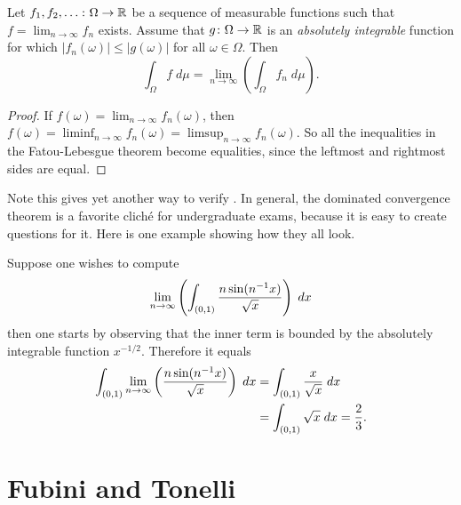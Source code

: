 \begin{corollary}
	Let $f_1, f_2, \dots \colon \Omega \to \mathbb R$
	be a sequence of measurable functions
	such that $f = \lim_{n \to \infty} f_n$ exists.
	Assume that $g \colon \Omega \to \mathbb R$ is an
	\emph{absolutely integrable} function for which
	$|f_n(\omega)| \le |g(\omega)|$ for all $\omega \in \Omega$.
	Then
	\[ \int_\Omega f \; d \mu
		= \lim_{n \to \infty} \left( \int_\Omega f_n \; d\mu \right). \]
\end{corollary}
\begin{proof}
	If $f(\omega) = \lim_{n \to \infty} f_n(\omega)$,
	then $f(\omega) = \liminf_{n \to \infty} f_n(\omega)
	= \limsup_{n \to \infty} f_n(\omega)$.
	So all the inequalities in the Fatou-Lebesgue theorem
	become equalities, since the leftmost and rightmost sides are equal.
\end{proof}
Note this gives yet another way to verify .
In general, the dominated convergence theorem
is a favorite clich\'{e} for undergraduate exams,
because it is easy to create questions for it.
Here is one example showing how they all look.
\begin{example}
	Suppose one wishes to compute
	\[ \lim_{n \to \infty}
		\left( \int_{(0,1)} \frac{n\sin(n^{-1} x)}{\sqrt x} \right) \; dx \]
	then one starts by observing that
	the inner term is bounded by the absolutely integrable function $x^{-1/2}$.
	Therefore it equals
	\begin{align*}
		\int_{(0,1)} \lim_{n \to \infty}
			\left( \frac{n\sin(n^{-1} x)}{\sqrt x} \right) \; dx
		&= \int_{(0,1)} \frac{x}{\sqrt x} \; dx \\
		&= \int_{(0,1)} \sqrt{x} \; dx = \frac23.
	\end{align*}
\end{example}

\section{Fubini and Tonelli}

\section{\problemhead}

